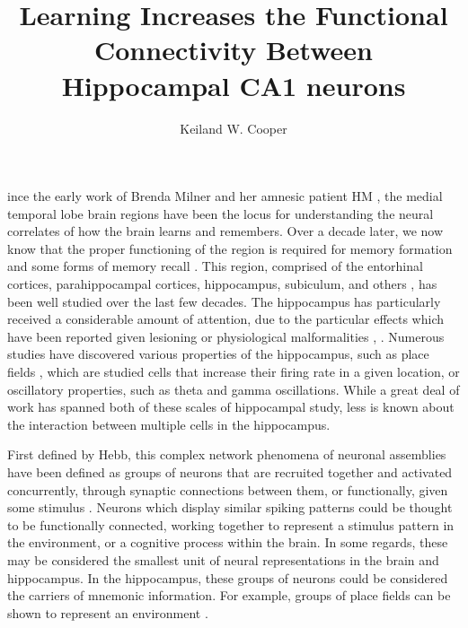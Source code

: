 \documentclass[9pt,twocolumn,twoside,lineno]{pnas-new}
\title{Learning Increases the Functional Connectivity Between Hippocampal CA1 neurons}
\author[a,b,1]{Keiland W. Cooper}
\affil[a]{Psychological and Brain Sciences, Indiana University Bloomington}
\affil[b]{Program in Cognitive Science, Indiana University Bloomington}
\begin{document}
\maketitle
\thispagestyle{firststyle}

ince the early work of Brenda Milner and her amnesic patient HM \cite{scoville1957loss}, the medial temporal lobe brain regions have been the locus for understanding the neural correlates of how the brain learns and remembers. Over a decade later, we now know that the proper functioning of the region is required for memory formation and some forms of memory recall \cite{fyhn2007hippocampal}. This region, comprised of the entorhinal cortices, parahippocampal cortices, hippocampus, subiculum, and others \cite{scoville1957loss}, has been well studied over the last few decades. The hippocampus has particularly received a considerable amount of attention, due to the particular effects which have been reported given lesioning or physiological malformalities \cite{scoville1957loss}, \cite{grosmark2016diversity}. Numerous studies have discovered various properties of the hippocampus, such as place fields \cite{fyhn2007hippocampal}, which are studied cells that increase their firing rate in a given location, or oscillatory properties, such as theta and gamma oscillations. While a great deal of work has spanned both of these scales of hippocampal study, less is known about the interaction between multiple cells in the hippocampus.

First defined by Hebb, this complex network phenomena of neuronal assemblies have been defined as groups of neurons that are recruited together and activated concurrently, through synaptic connections between them, or functionally, given some stimulus \cite{pastalkova2008internally}. Neurons which display similar spiking patterns could be thought to be functionally connected, working together to represent a stimulus pattern in the environment, or a cognitive process within the brain. In some regards, these may be considered the smallest unit of neural representations in the brain and hippocampus. In the hippocampus, these groups of neurons could be considered the carriers of mnemonic information. For example, groups of place fields can be shown to represent an environment \cite{fyhn2007hippocampal}.
\end{document}
